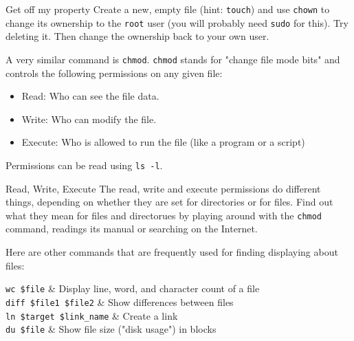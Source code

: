 \documentclass{TheAlternativeCourse}
\begin{document}
\begin{exercisebox}{Get off my property}
	Create a new, empty file (hint: \texttt{touch}) and use \texttt{chown} to change its ownership to the \texttt{root} user (you will probably need \texttt{sudo} for this). Try deleting it. Then change the ownership back to your own user.
\end{exercisebox}

A very similar command is \texttt{chmod}. \texttt{chmod} stands for "change file mode bits" and controls the following permissions on any given file:
\begin{itemize}
	\item Read: Who can see the file data.
	\item Write: Who can modify the file.
	\item Execute: Who is allowed to run the file (like a program or a script)
\end{itemize}

\begin{hintbox}
	Permissions can be read using \texttt{ls -l}.
\end{hintbox}

\begin{exercisebox}{Read, Write, Execute}
	The read, write and execute permissions do different things, depending on whether they are set for directories or for files. Find out what they mean for files and directorues by playing around with the \texttt{chmod} command, readings its manual or searching on the Internet.
\end{exercisebox}

Here are other commands that are frequently used for finding displaying about files:\\
%
\begin{table}[H]
    \centering
    \begin{tcolorbox}[%
        enhanced,
        fuzzy shadow={1mm}{-1mm}{0mm}{0.1mm}{black!50!white},
        width=1.0\linewidth,
        tabularx={>{\centering\arraybackslash}l|>{\centering\arraybackslash}X},
        title={Commands for getting info about files}]
	    \texttt{wc \$file} & Display line, word, and character count of a file \\
	    \texttt{diff \$file1 \$file2} & Show differences between files\\
	    \texttt{ln \$target \$link\_name} & Create a link\\
	    \texttt{du \$file} & Show file size ("disk usage") in blocks\\
    \end{tcolorbox}
    \label{tab1}
\end{table}
\end{document}

